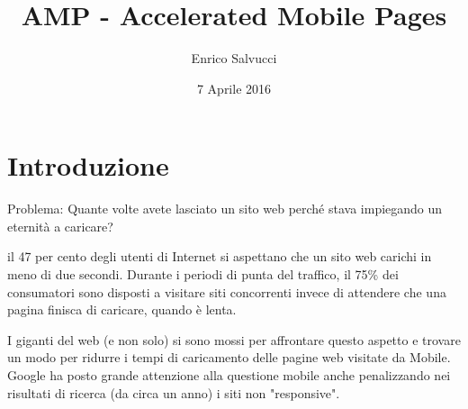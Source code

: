 \documentclass{article}
\title{AMP - Accelerated Mobile Pages}
\author{Enrico Salvucci}
\date{7 Aprile 2016}
\begin{document}
\maketitle

\section{Introduzione}

Problema: Quante volte avete lasciato un sito web perché stava impiegando un eternità a caricare?

il 47 per cento degli utenti di Internet si aspettano che un sito web carichi in meno di due secondi.
Durante i periodi di punta del traffico, il 75\% dei consumatori sono disposti a visitare siti concorrenti invece di attendere che una pagina finisca di caricare, quando è lenta.

I giganti del web (e non solo) si sono mossi per affrontare questo aspetto e trovare un modo per ridurre i tempi di caricamento delle pagine web visitate da Mobile.
Google ha posto grande attenzione alla questione mobile anche penalizzando nei risultati di ricerca (da circa un anno) i siti non "responsive".
\end{document}
